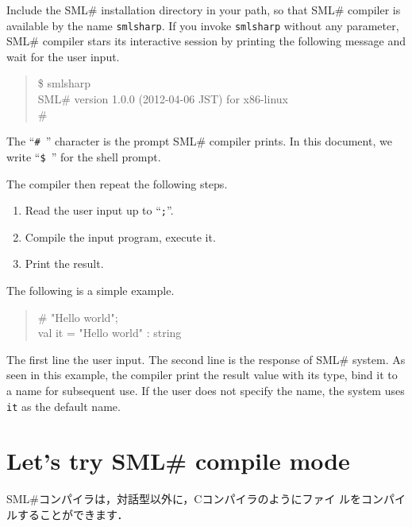 \documentclass{jbook}
\newcommand{\txt}[2]{#2}
\newcommand{\smlsharp}{SML\#}
\newenvironment{program}{\begin{tt}\begin{quote}}{\end{quote}\end{tt}}
\begin{document}
	Include the \smlsharp{} installation directory in your path, 
so that \smlsharp{} compiler is available by the name {\tt smlsharp}.
	If you invoke {\tt smlsharp} without any parameter, \smlsharp{}
compiler stars its interactive session by printing the following
message and wait for the user input.
\begin{program}
\$ smlsharp\\
SML\# version 1.0.0 (2012-04-06 JST) for x86-linux\\
\# 
\end{program}
	The ``{\tt \#\ }'' character is the prompt \smlsharp{} compiler
prints.
	In this document, we write ``{\tt \$\ }'' for the 
shell prompt.

	The compiler then repeat the following steps.
\begin{enumerate}
\item Read the user input up to ``{\tt ;}''.
\item Compile the input program, execute it.
\item Print the result.
\end{enumerate}
	The following is a simple example.
\begin{tt}
\begin{quote}
\# "Hello world";\\
val it = "Hello world" : string
\end{quote}
\end{tt}
	The first line the user input.
	The second line is the response of \smlsharp{} system.
	As seen in this example, the compiler print the result value with
its type, bind it to a name for subsequent use.
	If the user does not specify the name, the system uses  {\tt it}
as the default name.

\fi%

\section{
\txt
{\smlsharp{}のコンパイルモードを試してみよう}
{Let's try \smlsharp{} compile mode}
}
\label{sec:tutorialCompile}
\ifx\jp%
	\smlsharp{}コンパイラは，対話型以外に，Cコンパイラのようにファイ
ルをコンパイルすることができます．
\end{document}
